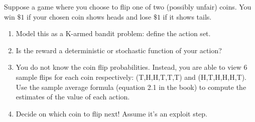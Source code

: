 Suppose a game where you choose to flip one of two (possibly unfair) coins. You win $\$1$ if your chosen coin shows heads and lose $\$1$ if it shows tails.


\begin{enumerate}[label=(\alph*)]
  \item Model this as a K-armed bandit problem: define the action set.%
  \twolines
  \item Is the reward a deterministic or stochastic function of your action? %
  \twolines
  \item You do not know the coin flip probabilities. Instead, you are able to view 6 sample flips for each coin respectively: (T,H,H,T,T,T) and (H,T,H,H,H,T). Use the sample average formula (equation 2.1 in the book) to compute the estimates of the value of each action. %
  \twolines
  \item Decide on which coin to flip next! Assume it's an exploit step. %
  \twolines
\end{enumerate}

